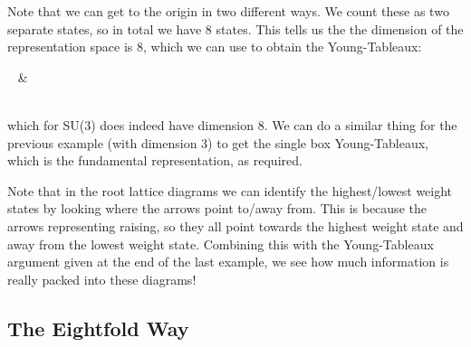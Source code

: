     Note that we can get to the origin in two different ways. We count these as two separate states, so in total we have $8$ states. This tells us the the dimension of the representation space is $8$, which we can use to obtain the Young-Tableaux: 
    \begin{center}
        \byt 
            ~ & \\
            ~
        \eyt 
    \end{center}
    which for SU(3) does indeed have dimension $8$. We can do a similar thing for the previous example (with dimension 3) to get the single box Young-Tableaux, which is the fundamental representation, as required.
\eex 

\br 
    Note that in the root lattice diagrams we can identify the highest/lowest weight states by looking where the arrows point to/away from. This is because the arrows representing raising, so they all point towards the highest weight state and away from the lowest weight state. Combining this with the Young-Tableaux argument given at the end of the last example, we see how much information is really packed into these diagrams!
\er 

\subsection{The Eightfold Way}


